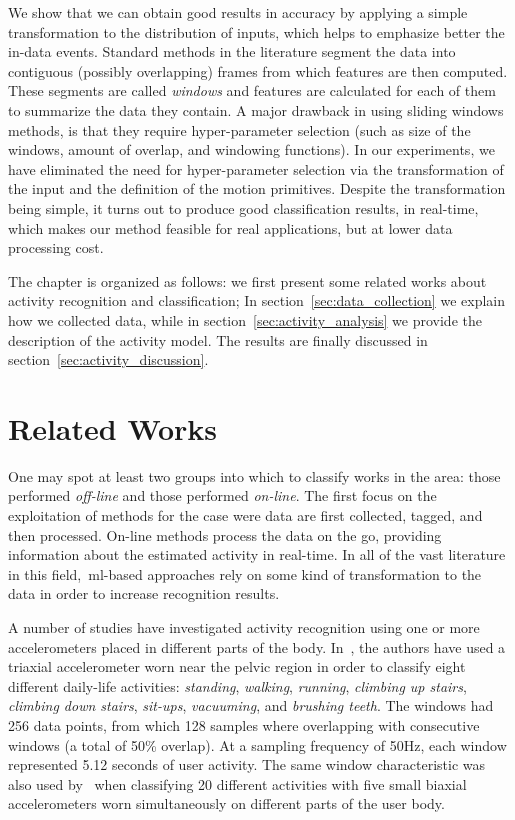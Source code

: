 We show that we can obtain good results in accuracy by applying a simple transformation to the distribution of inputs, which helps to emphasize better the in-data events. Standard methods in the literature segment the data into contiguous (possibly overlapping) frames from which features are then computed. These segments are called \textit{windows} and features are calculated for each of them to summarize the data they contain. A major drawback in using sliding windows methods, is that they require hyper-parameter selection (such as size of the windows, amount of overlap, and windowing functions). In our experiments, we have eliminated the need for hyper-parameter selection via the transformation of the input and the definition of the motion primitives. Despite the transformation being simple, it turns out to produce good classification results, in real-time, which makes our method feasible for real applications, but at lower data processing cost.

The chapter is organized as follows: we first present some related works about activity recognition and classification; In section~\ref{sec:data_collection} we explain how we collected data, while in section~\ref{sec:activity_analysis} we provide the description of the activity model. The results are finally discussed in section~\ref{sec:activity_discussion}.

\section{Related Works}\label{sec:act_related_works}

One may spot at least two groups into which to classify works in the area: those performed \textit{off-line} and those performed \textit{on-line}. The first focus on the exploitation of methods for the case were data are first collected, tagged, and then processed. On-line methods  process the data on the go, providing information about the estimated activity in real-time. In all of the vast literature in this field,~\gls{ml}-based approaches rely on some kind of transformation to the data in order to increase recognition results. %

A number of studies have investigated activity recognition using one or more accelerometers placed in different parts of the body. In~\cite{ravi_activity_2005}, the authors have used a triaxial accelerometer worn near the pelvic region in order to classify eight different daily-life activities: \textit{standing}, \textit{walking}, \textit{running}, \textit{climbing up stairs}, \textit{climbing down stairs}, \textit{sit-ups}, \textit{vacuuming}, and \textit{brushing teeth}. The windows had 256 data points, from which 128 samples where overlapping with consecutive windows (a total of 50\% overlap). At a sampling frequency of 50Hz, each window represented 5.12 seconds of user activity. The same window characteristic was also used by~\cite{bao_activity_2004} when classifying 20 different activities with five small biaxial accelerometers worn simultaneously on different parts of the user body.

